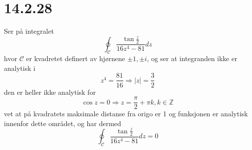 \documentclass{report}
\newcommand{\M}[2]{\mathbb{#1}^{#2}}
\begin{document}
\section*{14.2.28}
Ser på integralet
\begin{equation}
  \label{eq:27}
  \oint_{\mathcal{C}} \frac{\tan \frac{z}{2}}{16z^{4} - 81} dz
\end{equation}
hvor $\mathcal{C}$ er kvadretet definert av hjørnene $\pm 1, \pm i$, og ser at integranden ikke er analytisk i
\begin{equation}
  \label{eq:28}
  z^{4} = \frac{81}{16} \Rightarrow |z| = \frac{3}{2}
\end{equation}
den er heller ikke analytisk for
\begin{equation}
  \label{eq:29}
  \cos z = 0 \Rightarrow z = \frac{\pi}{2} + \pi k, k \in \M{Z}{}
\end{equation}
vet at på kvadratets maksimale distanse fra origo er 1 og funksjonen er analytisk innenfor dette området, og har dermed
\begin{equation}
  \label{eq:30}
  \oint_{\mathcal{C}} \frac{\tan \frac{z}{2}}{16z^{4} - 81} dz = 0
\end{equation}
\sigma
\end{document}
